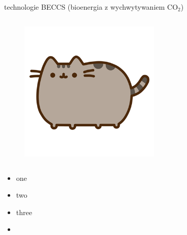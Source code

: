 \begin{columnframe}{technologie BECCS (bioenergia z wychwytywaniem CO$_2$)}
    \begin{column}{0.5\textwidth}
        \begin{figure}
            \centering
            \includegraphics[width=0.6\textwidth, frame]{images/pusheen.png}
        \end{figure}
    \end{column}
    \begin{column}{0.5\textwidth}
        \begin{itemize}
            \item one \keV
            \item two \MeV
            \item three \GeV
            \item \aegis
        \end{itemize}
    \end{column}
\end{columnframe}

